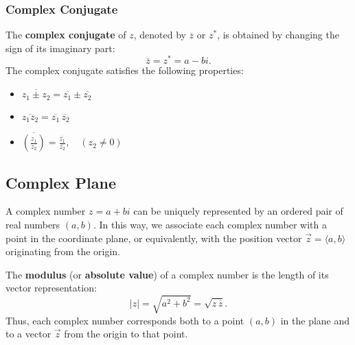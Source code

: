 \documentclass[11pt]{article}
\begin{document}
\subsubsection*{Complex Conjugate}
The \textbf{complex conjugate} of $z$, denoted by $\overline{z}$ or $z^\ast$, is obtained by changing the sign of its imaginary part:
\[
    \overline{z} = z^\ast = a - bi.
\]
The complex conjugate satisfies the following properties:
\begin{itemize}
    \item $\displaystyle \overline{z_1 \pm z_2} = \overline{z_1} \pm \overline{z_2}$
    \item $\displaystyle \overline{z_1 z_2} = \overline{z_1} \, \overline{z_2}$
    \item $\displaystyle \overline{\left(\frac{z_1}{z_2}\right)} = \frac{\overline{z_1}}{\overline{z_2}}, \quad (z_2 \neq 0)$
\end{itemize}
\subsection{Complex Plane}
A complex number $z = a + bi$ can be uniquely represented by an ordered pair of real numbers $(a, b)$.  
In this way, we associate each complex number with a point in the coordinate plane, or equivalently,  
with the position vector $\vec{z} = \langle a, b \rangle$ originating from the origin.
\begin{center}
\end{center}
The \textbf{modulus} (or \textbf{absolute value}) of a complex number is the length of its vector representation:
\[
    |z| = \sqrt{a^2 + b^2} = \sqrt{z\,\overline{z}}.
\]
Thus, each complex number corresponds both to a point $(a, b)$ in the plane and to a vector $\vec{z}$ from the origin to that point.
\end{document}
